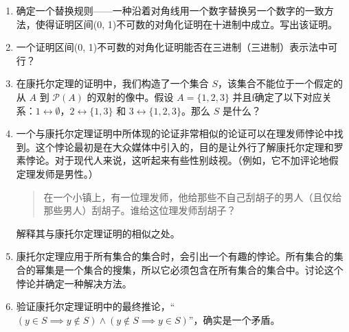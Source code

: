 \begin{enumerate}
    \item 
    
    确定一个替换规则——一种沿着对角线用一个数字替换另一个数字的一致方法，使得证明区间(0, 1)不可数的对角化证明在十进制中成立。写出该证明。
    
    \wbvfill
    
    \item
    一个证明区间(0, 1)不可数的对角化证明能否在三进制（三进制）表示法中可行？
    \wbvfill
    
    \workbookpagebreak
    
    \item 
    
    在康托尔定理的证明中，我们构造了一个集合 $S$，该集合不能位于一个假定的从 $A$ 到 ${\mathcal P}(A)$ 的双射的像中。假设 $A = \{1, 2, 3\}$ 并且f确定了以下对应关系：$1 \longleftrightarrow \emptyset$，$2 \longleftrightarrow \{1, 3\}$ 和 $3 \longleftrightarrow \{1, 2, 3\}$。那么 $S$ 是什么？
    
    \wbvfill
    
    \item 
    一个与康托尔定理证明中所体现的论证非常相似的论证可以在理发师悖论中找到。这个悖论最初是在大众媒体中引入的，目的是让外行了解康托尔定理和罗素悖论。对于现代人来说，这听起来有些性别歧视。（例如，它不加评论地假定理发师是男性。）
    
    \begin{quote}
    
    在一个小镇上，有一位理发师，他给那些不自己刮胡子的男人（且仅给那些男人）刮胡子。谁给这位理发师刮胡子？
    \end{quote}
        
    解释其与康托尔定理证明的相似之处。
    \wbvfill
    
    \workbookpagebreak
    
    \item 
    康托尔定理应用于所有集合的集合时，会引出一个有趣的悖论。所有集合的集合的幂集是一个集合的搜集，所以它必须包含在所有集合的集合中。讨论这个悖论并确定一种解决方法。
    
    \wbvfill
    
    \item 
    验证康托尔定理证明中的最终推论，“$(y \in S  \implies  y \notin S) \land  (y \notin S \implies y \in S)$”，确实是一个矛盾。
    \wbvfill
    
    \workbookpagebreak
    
    \end{enumerate}
    

